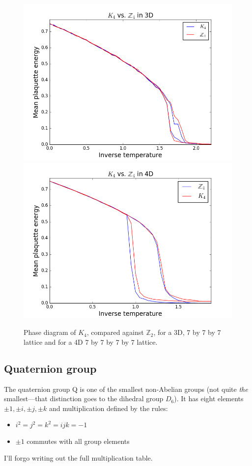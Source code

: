 \documentclass[9pt,twocolumn,twoside]{article}
\begin{document}
\begin{figure}[h!]
	\begin{centering}
	\includegraphics[width=\columnwidth]{k4vz4,3d}
	\includegraphics[width=\columnwidth]{k4vz4,4d}
	\caption{Phase diagram of $K_4$, compared against $\mathbb{Z}_2$, for a 3D, 7 by 7 by 7 lattice and for a 4D 7 by 7 by 7 by 7 lattice.}
	\label{k4vz4}
	\end{centering}
\end{figure}

\subsection{Quaternion group}
The quaternion group Q is one of the smallest non-Abelian groups (not quite \textit{the} smallest---that distinction goes to the dihedral group $D_6$).  It has eight elements $\pm1,\pm i, \pm j, \pm k$ and multiplication defined by the rules:
\begin{itemize}
\item $i^2=j^2=k^2=ijk=-1$
\item $\pm1$ commutes with all group elements
\end{itemize}
I'll forgo writing out the full multiplication table.  
\end{document}
